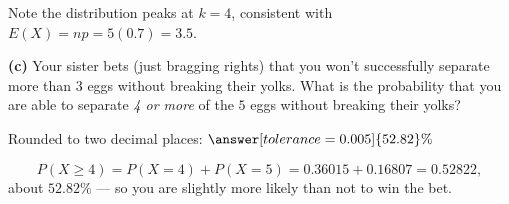 \documentclass[12pt]{ximera}
\begin{document}
\begin{problem}
\begin{prompt}
\begin{feedback}
Note the distribution peaks at $k=4$, consistent with $E(X)=np=5(0.7)=3.5$.
\end{feedback}
\end{prompt}

\begin{prompt}
\textbf{(c)} Your sister bets (just bragging rights) that you won't successfully
separate more than $3$ eggs without breaking their yolks. What is the probability that
you are able to separate \emph{4 or more} of the $5$ eggs without breaking their
yolks?

Rounded to two decimal places: $\answer[tolerance=0.005]{52.82}\%$

\begin{feedback}
\[
P(X\ge 4)=P(X=4)+P(X=5)=0.36015+0.16807=0.52822,
\]
about $52.82\%$ --- so you are slightly more likely than not to win the bet.
\end{feedback}
\end{prompt}
\end{problem}
\end{document}
